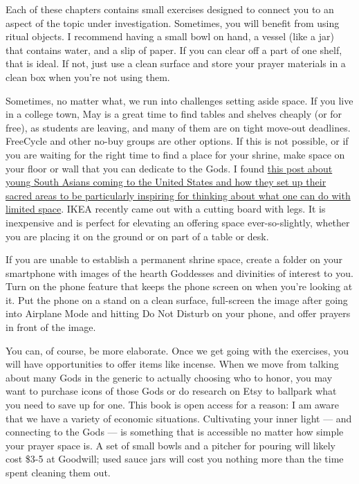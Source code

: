 \documentclass[
]{book}
\begin{document}
Each of these chapters contains small exercises designed to connect you to an aspect of the topic under investigation. Sometimes, you will benefit from using ritual objects. I recommend having a small bowl on hand, a vessel (like a jar) that contains water, and a slip of paper. If you can clear off a part of one shelf, that is ideal. If not, just use a clean surface and store your prayer materials in a clean box when you're not using them.

Sometimes, no matter what, we run into challenges setting aside space. If you live in a college town, May is a great time to find tables and shelves cheaply (or for free), as students are leaving, and many of them are on tight move-out deadlines. FreeCycle and other no-buy groups are other options. If this is not possible, or if you are waiting for the right time to find a place for your shrine, make space on your floor or wall that you can dedicate to the Gods. I found \href{https://web.archive.org/web/20220103123537/https://religionnews.com/2021/10/13/millennial-hindus-get-creative-with-home-temples-in-cramped-apartments/}{this post about young South Asians coming to the United States and how they set up their sacred areas to be particularly inspiring for thinking about what one can do with limited space}. IKEA recently came out with a cutting board with legs. It is inexpensive and is perfect for elevating an offering space ever-so-slightly, whether you are placing it on the ground or on part of a table or desk.

If you are unable to establish a permanent shrine space, create a folder on your smartphone with images of the hearth Goddesses and divinities of interest to you. Turn on the phone feature that keeps the phone screen on when you're looking at it. Put the phone on a stand on a clean surface, full-screen the image after going into Airplane Mode and hitting Do Not Disturb on your phone, and offer prayers in front of the image.

You can, of course, be more elaborate. Once we get going with the exercises, you will have opportunities to offer items like incense. When we move from talking about many Gods in the generic to actually choosing who to honor, you may want to purchase icons of those Gods or do research on Etsy to ballpark what you need to save up for one. This book is open access for a reason: I am aware that we have a variety of economic situations. Cultivating your inner light --- and connecting to the Gods --- is something that is accessible no matter how simple your prayer space is. A set of small bowls and a pitcher for pouring will likely cost \$3-5 at Goodwill; used sauce jars will cost you nothing more than the time spent cleaning them out.
\end{document}
